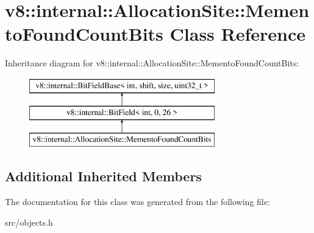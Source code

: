 \hypertarget{classv8_1_1internal_1_1_allocation_site_1_1_memento_found_count_bits}{}\section{v8\+:\+:internal\+:\+:Allocation\+Site\+:\+:Memento\+Found\+Count\+Bits Class Reference}
\label{classv8_1_1internal_1_1_allocation_site_1_1_memento_found_count_bits}
Inheritance diagram for v8\+:\+:internal\+:\+:Allocation\+Site\+:\+:Memento\+Found\+Count\+Bits\+:\begin{figure}[H]
\begin{center}
\leavevmode
\includegraphics[height=3.000000cm]{classv8_1_1internal_1_1_allocation_site_1_1_memento_found_count_bits}
\end{center}
\end{figure}
\subsection*{Additional Inherited Members}


The documentation for this class was generated from the following file\+:\begin{DoxyCompactItemize}
\item 
src/objects.\+h\end{DoxyCompactItemize}
